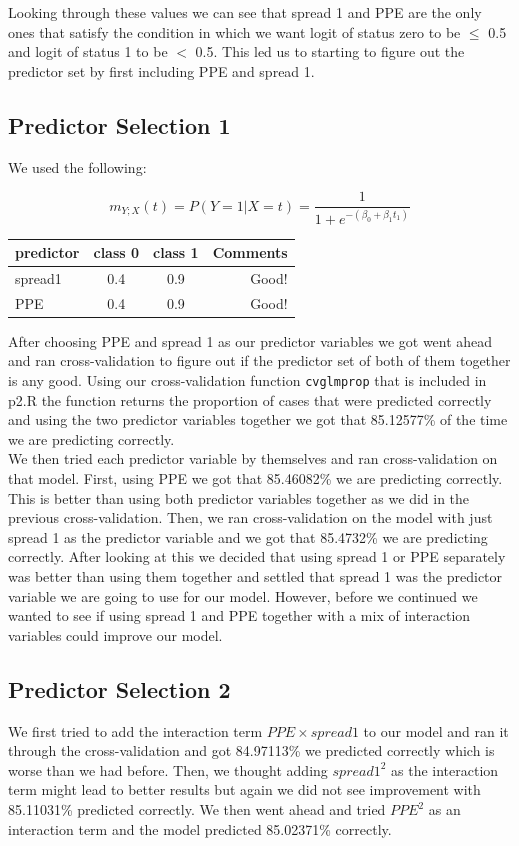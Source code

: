 \documentclass{article}
\begin{document}
Looking through these values we can see that spread 1 and PPE are the only ones that satisfy the condition in which we want logit of status zero to be $\leq$ 0.5 and logit of status 1 to be $<$ 0.5. This led us to starting to figure out the predictor set by first including PPE and spread 1.

\subsection{Predictor Selection 1}

We used the following:

\begin{equation}
\label{logit2}
m_{Y;X}(t) = P(Y = 1 | X = t) = \frac{1}{1+e^{-(\beta_0+\beta_1
t_1)}}
\end{equation}

\begin{tabular}{l|c|c|r}
predictor & class 0 & class 1 & Comments \\
\hline
spread1 & 0.4 & 0.9 & Good! \\
PPE & 0.4 & 0.9 & Good! \\
\end{tabular}

After choosing PPE and spread 1 as our predictor variables we got went ahead and ran cross-validation to figure out if the predictor set of both of them together is any good. Using our cross-validation function \verb+cvglmprop+ that is included in p2.R the function returns the proportion of cases that were predicted correctly and using the two predictor variables together we got that 85.12577\% of the time we are predicting correctly.\\

We then tried each predictor variable by themselves and ran cross-validation on that model. First, using PPE we got that 85.46082\% we are predicting correctly. This is better than using both predictor variables together as we did in the previous cross-validation. Then, we ran cross-validation on the model with just spread 1 as the predictor variable and we got that 85.4732\% we are predicting correctly. After looking at this we decided that using spread 1 or PPE separately was better than using them together and settled that spread 1 was the predictor variable we are going to use for our model. However, before we continued we wanted to see if using spread 1 and PPE together with a mix of interaction variables could improve our model.  
\subsection{Predictor Selection 2}
We first tried to add the interaction term $PPE \times spread 1$ to our model and ran it through the cross-validation and got 84.97113\% we predicted correctly which is worse than we had before. Then, we thought adding $spread1^{2}$ as the interaction term might lead to better results but again we did not see improvement with 85.11031\% predicted correctly. We then went ahead and tried $PPE^{2}$ as an interaction term and the model predicted 85.02371\% correctly.
\end{document}
